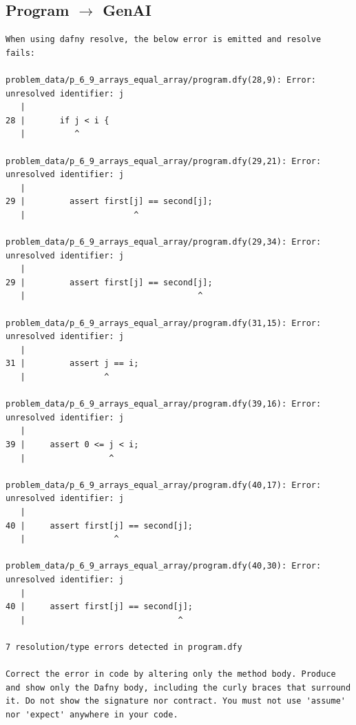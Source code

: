 \documentclass{article}
\begin{document}
\subsection*{Program $\rightarrow$ GenAI}
\begin{lstlisting}
When using dafny resolve, the below error is emitted and resolve fails:

problem_data/p_6_9_arrays_equal_array/program.dfy(28,9): Error: unresolved identifier: j
   |
28 |       if j < i {
   |          ^

problem_data/p_6_9_arrays_equal_array/program.dfy(29,21): Error: unresolved identifier: j
   |
29 |         assert first[j] == second[j];
   |                      ^

problem_data/p_6_9_arrays_equal_array/program.dfy(29,34): Error: unresolved identifier: j
   |
29 |         assert first[j] == second[j];
   |                                   ^

problem_data/p_6_9_arrays_equal_array/program.dfy(31,15): Error: unresolved identifier: j
   |
31 |         assert j == i;
   |                ^

problem_data/p_6_9_arrays_equal_array/program.dfy(39,16): Error: unresolved identifier: j
   |
39 |     assert 0 <= j < i;
   |                 ^

problem_data/p_6_9_arrays_equal_array/program.dfy(40,17): Error: unresolved identifier: j
   |
40 |     assert first[j] == second[j];
   |                  ^

problem_data/p_6_9_arrays_equal_array/program.dfy(40,30): Error: unresolved identifier: j
   |
40 |     assert first[j] == second[j];
   |                               ^

7 resolution/type errors detected in program.dfy

Correct the error in code by altering only the method body. Produce and show only the Dafny body, including the curly braces that surround it. Do not show the signature nor contract. You must not use 'assume' nor 'expect' anywhere in your code.
\end{lstlisting}
\end{document}
